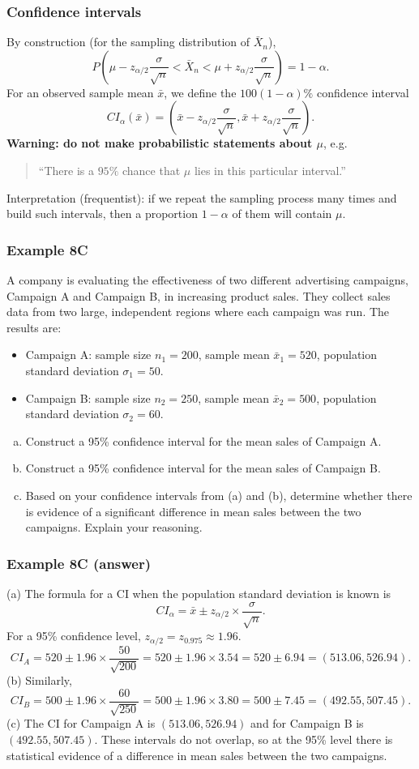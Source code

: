 \documentclass[t,8pt]{beamer}
\begin{document}
\begin{frame}
	\frametitle{Confidence intervals}
	By construction (for the sampling distribution of $\bar X_n$),
	\[
	P\left(\mu - z_{\alpha/2}\frac{\sigma}{\sqrt n}
	<\bar X_n<
	\mu + z_{\alpha/2}\frac{\sigma}{\sqrt n}\right)=1-\alpha.
	\]
	For an observed sample mean $\bar x$, we define the $100(1-\alpha)\%$ confidence interval
	\[
	CI_{\alpha}(\bar x)=\left(\bar x-z_{\alpha/2}\frac{\sigma}{\sqrt n},
	\bar x+z_{\alpha/2}\frac{\sigma}{\sqrt n}\right).
	\]
	{\bf Warning: do not make probabilistic statements about $\mu$}, e.g.
	\begin{quote}
		``There is a $95\%$ chance that $\mu$ lies in this particular interval.''
	\end{quote}
	Interpretation (frequentist): if we repeat the sampling process many times and build such intervals, then a proportion $1-\alpha$ of them will contain $\mu$.
\end{frame}

\begin{frame}
	\frametitle{Example 8C}
	A company is evaluating the effectiveness of two different advertising campaigns, Campaign A and Campaign B, in increasing product sales. They collect sales data from two large, independent regions where each campaign was run. The results are:
	\begin{itemize}
		\item Campaign A: sample size $n_1 = 200$, sample mean $\bar{x}_1 = 520$, population standard deviation $\sigma_1 = 50$.
		\item Campaign B: sample size $n_2 = 250$, sample mean $\bar{x}_2 = 500$, population standard deviation $\sigma_2 = 60$.
	\end{itemize}
	\begin{enumerate}[(a)]
		\item Construct a 95\% confidence interval for the mean sales of Campaign A.
		\item Construct a 95\% confidence interval for the mean sales of Campaign B.
		\item Based on your confidence intervals from (a) and (b), determine whether there is evidence of a significant difference in mean sales between the two campaigns. Explain your reasoning.
	\end{enumerate}
\end{frame}

\begin{frame}
	\frametitle{Example 8C (answer)}
	(a) The formula for a CI when the population standard deviation is known is
	\[
	CI_{\alpha} = \bar{x} \pm z_{\alpha/2} \times \frac{\sigma}{\sqrt{n}}.
	\]
	For a 95\% confidence level, $z_{\alpha/2} = z_{0.975} \approx 1.96$.
	\[
	CI_A = 520 \pm 1.96 \times \frac{50}{\sqrt{200}}
	= 520 \pm 1.96 \times 3.54
	= 520 \pm 6.94
	= (513.06, 526.94).
	\]
	(b) Similarly,
	\[
	CI_B = 500 \pm 1.96 \times \frac{60}{\sqrt{250}}
	= 500 \pm 1.96 \times 3.80
	= 500 \pm 7.45
	= (492.55, 507.45).
	\]
	(c) The CI for Campaign A is $(513.06, 526.94)$ and for Campaign B is $(492.55, 507.45)$. These intervals do not overlap, so at the 95\% level there is statistical evidence of a difference in mean sales between the two campaigns.
\end{frame}
\end{document}
